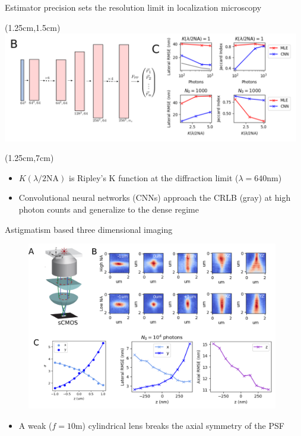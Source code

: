 \documentclass{beamer}					%
\begin{document}
\begin{frame}{Estimator precision sets the resolution limit in localization microscopy}

\begin{textblock*}{10cm}(1.25cm,1.5cm)
\includegraphics[width=13cm]{PSF2D-Crop.png}
\end{textblock*}
\begin{textblock*}{13cm}(1.25cm,7cm)
\begin{itemize}
\item $K(\lambda/2\mathrm{NA})$ is Ripley's K function at the diffraction limit ($\lambda=640\mathrm{nm}$)
\item Convolutional neural networks (CNNs) approach the CRLB (gray) at high photon counts and generalize to the dense regime
\end{itemize}
\end{textblock*}

\end{frame}


\begin{frame}{Astigmatism based three dimensional imaging}
\begin{figure}
\includegraphics[width=11cm]{Astigmatism.png}
\end{figure}
\begin{itemize}
\item A weak ($f=10$m) cylindrical lens breaks the axial symmetry of the PSF
\end{itemize}
\end{frame}
\end{document}
